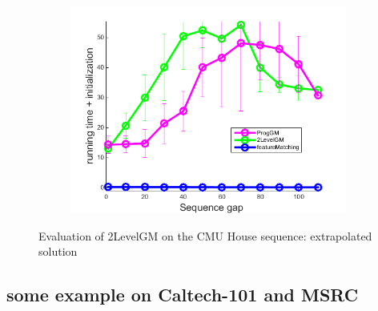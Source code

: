 \begin{figure}[h]
\begin{subfigure}[b]{0.32\textwidth}
			\includegraphics[scale=0.25]{"chapter3/fig/HouseSeq2/anchor_descr/using_cpd_afftrafo/ext_solution/performance/time_summary"}
		\end{subfigure} 	
	\caption[Evaluation of 2LevelGM on the CMU House sequence]{Evaluation of 2LevelGM on the CMU House sequence: extrapolated solution} \label{fig:House_ext_sol}
\end{figure}

\FloatBarrier

\subsection{some example on Caltech-101 and MSRC}